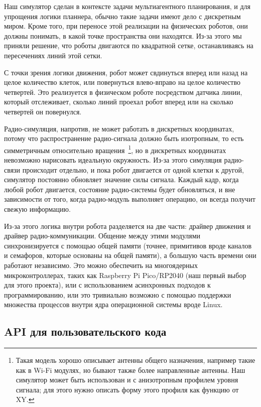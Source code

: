 \documentclass[%
]{article}
\begin{document}
Наш симулятор сделан в контексте задачи мультиагентного планирования,
и для упрощения логики планнера,
обычно такие задачи имеют дело с дискретным миром.
Кроме того, при переносе этой реализации на физических роботов,
они должны понимать,
в какой точке пространства они находятся.
Из-за этого мы приняли решение,
что роботы двигаются по квадратной сетке,
останавливаясь на пересечениях линий этой сетки.

С точки зрения логики движения, робот может свдинуться вперед или назад на целое количество клеток,
или повернуться влево-вправо на целое количество четвертей.
Это реализуется в физическом роботе посредством датчика линии,
который отслеживает, сколько линий проехал робот вперед
или на сколько четвертей он повернулся.

Радио-симуляция, напротив, не может работать в дискретных координатах,
потому что распространение радио-сигнала должно быть изотропным,
то есть симметричным относительно вращения~\footnote{Такая модель хорошо описывает антенны общего назначения,
например такие как в Wi-Fi модулях,
но бывают также более направленные антенны.
Наш симулятор может быть использован и с анизотропным профилем уровня сигнала;
для этого нужно описать форму этого профиля как функцию от XY.},
но в дискретных координатах невозможно нарисовать идеальную окружность.
Из-за этого симуляция радио-связи происходит отдельно,
и пока робот двигается от одной клетки к другой,
симулятор постоянно обновляет значение силы сигнала.
Каждый кадр, когда любой робот двигается,
состояние радио-системы будет обновляться,
и вне зависимости от того,
когда радио-модуль выполняет операцию,
он всегда получит свежую информацию.

Из-за этого логика внутри робота разделяется на две части: 
драйвер движения и драйвер радио-коммуникации.
Общение между этими модулями синхронизируется с помощью общей памяти (точнее, примитивов вроде каналов и семафоров, которые основаны на общей памяти),
а большую часть времени они работают независимо.
Это можно обеспечить на многоядерных микроконтроллерах,
таких как Raspberry Pi Pico/RP2040 (наш первый выбор для этого проекта),
или с использованием асинхронных подходов к программированию,
или это тривиально возможно с помощью поддержки множества процессов внутри ядра операционной системы вроде Linux.

\subsection{API для пользовательского кода}
\end{document}
